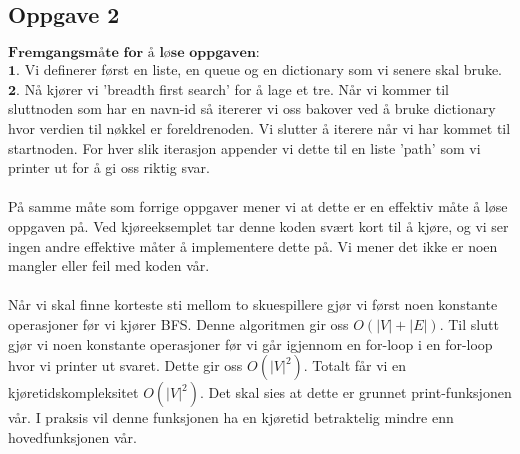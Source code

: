 \documentclass[a4paper, article, oneside, norsk]{memoir} %
\newcommand{\0}{\mathbf{0}}
\newcommand{\1}{\mathbf{1}}
\begin{document}
\subsection*{Oppgave 2}
$\textbf{Fremgangsmåte for å løse oppgaven:}$
\\
$\mathbf{1.}$ Vi definerer først en liste, en queue og en dictionary som vi senere skal bruke.
\\
$\mathbf{2.}$ Nå kjører vi 'breadth first search' for å lage et tre. Når vi kommer til sluttnoden som har en navn-id så itererer vi oss bakover ved å bruke dictionary hvor verdien til nøkkel er foreldrenoden. Vi slutter å iterere når vi har kommet til startnoden. For hver slik iterasjon appender vi dette til en liste 'path' som vi printer ut for å gi oss riktig svar.
\\
\\
På samme måte som forrige oppgaver mener vi at dette er en effektiv måte å løse oppgaven på. Ved kjøreeksemplet tar denne koden svært kort til å kjøre, og vi ser ingen andre effektive måter å implementere dette på. Vi mener det ikke er noen mangler eller feil med koden vår.
\\
\\
Når vi skal finne korteste sti mellom to skuespillere gjør vi først noen konstante operasjoner før vi kjører BFS. Denne algoritmen gir oss $O(|V|+|E|)$. Til slutt gjør vi noen konstante operasjoner før vi går igjennom en for-loop i en for-loop hvor vi printer ut svaret. Dette gir oss $O(|V|^2)$. Totalt får vi en kjøretidskompleksitet $O(|V|^2)$. Det skal sies at dette er grunnet print-funksjonen vår. I praksis vil denne funksjonen ha en kjøretid betraktelig mindre enn hovedfunksjonen vår.
\\
\end{document}
